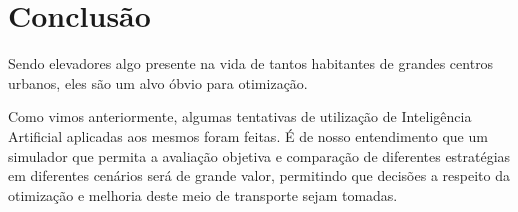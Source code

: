 \chapter{\label{chap:conclusion}Conclusão}

Sendo elevadores algo presente na vida de tantos habitantes de grandes centros
urbanos, eles são um alvo óbvio para otimização.

Como vimos anteriormente, algumas tentativas de utilização de Inteligência
Artificial aplicadas aos mesmos foram feitas. É de nosso entendimento que um
simulador que permita a avaliação objetiva e comparação de diferentes
estratégias em diferentes cenários será de grande valor, permitindo que decisões
a respeito da otimização e melhoria deste meio de transporte sejam tomadas.